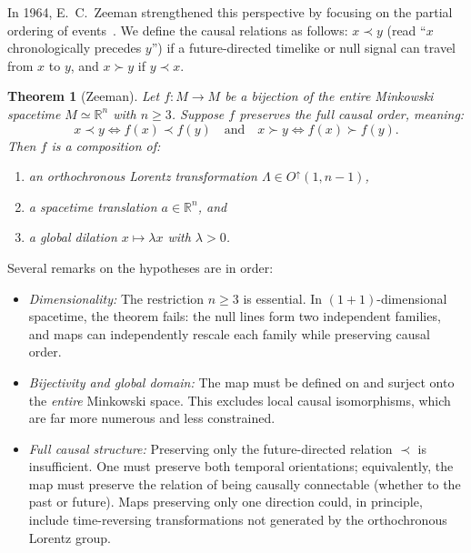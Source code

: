 \documentclass[aps,prd,twocolumn,nofootinbib,superscriptaddress]{revtex4-2}
\newtheorem{theorem}{Theorem}
\begin{document}
In 1964, E.~C.~Zeeman strengthened this perspective by focusing on the partial ordering of events~\cite{Zeeman}. We define the causal relations as follows: $x \prec y$ (read ``$x$ chronologically precedes $y$'') if a future-directed timelike or null signal can travel from $x$ to $y$, and $x \succ y$ if $y \prec x$.

\begin{theorem}[Zeeman]
Let $f: M \to M$ be a bijection of the entire Minkowski spacetime $M \simeq \mathbb{R}^n$ with $n \ge 3$. Suppose $f$ preserves the \emph{full} causal order, meaning:
\begin{equation}
x \prec y \iff f(x) \prec f(y) \quad \text{and} \quad x \succ y \iff f(x) \succ f(y).
\end{equation}
Then $f$ is a composition of:
\begin{enumerate}
    \item an orthochronous Lorentz transformation $\Lambda \in O^\uparrow(1, n-1)$,
    \item a spacetime translation $a \in \mathbb{R}^n$, and
    \item a global dilation $x \mapsto \lambda x$ with $\lambda > 0$.
\end{enumerate}
\end{theorem}

Several remarks on the hypotheses are in order:
\begin{itemize}
    \item \textit{Dimensionality:} The restriction $n \ge 3$ is essential. In $(1+1)$-dimensional spacetime, the theorem fails: the null lines form two independent families, and maps can independently rescale each family while preserving causal order.

    \item \textit{Bijectivity and global domain:} The map must be defined on and surject onto the \emph{entire} Minkowski space. This excludes local causal isomorphisms, which are far more numerous and less constrained.

    \item \textit{Full causal structure:} Preserving only the future-directed relation $\prec$ is insufficient. One must preserve both temporal orientations; equivalently, the map must preserve the relation of being causally connectable (whether to the past or future). Maps preserving only one direction could, in principle, include time-reversing transformations not generated by the orthochronous Lorentz group.
\end{itemize}
\end{document}
